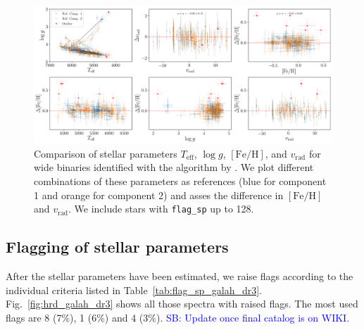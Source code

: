 \documentclass[fleqn,usenatbib,useAMS]{mnras}
\newcommand{\Teff}{$T_\mathrm{eff}$\xspace}
\newcommand{\logg}{$\log g$\xspace}
\newcommand{\feh}{$\mathrm{[Fe/H]}$\xspace}
\newcommand{\vrad}{$v_\mathrm{rad}$\xspace}
\newcommand\SB[1]{\textcolor{blue}{SB: #1}}
\begin{document}
\begin{figure}
\centering
\includegraphics[width=\textwidth]{figures/wide_binaries_sp.png}
\caption{Comparison of stellar parameters \Teff, \logg, \feh, and \vrad for wide binaries identified with the algorithm by \citet{ElBadry2018c}. We plot different combinations of these parameters as references (blue for component 1 and orange for component 2) and asses the difference in \feh and \vrad. We include stars with \texttt{flag\_sp} up to 128.}
\label{fig:wide_binary_sp}
\end{figure}

\subsection{Flagging of stellar parameters} \label{sec:flagging_sp}

After the stellar parameters have been estimated, we raise flags according to the individual criteria listed in Table~\ref{tab:flag_sp_galah_dr3}. Fig.~\ref{fig:hrd_galah_dr3} shows all those spectra with raised flags. The most used flags are 8 (7\%), 1 (6\%) and 4 (3\%). \SB{Update once final catalog is on WIKI.}
\end{document}
